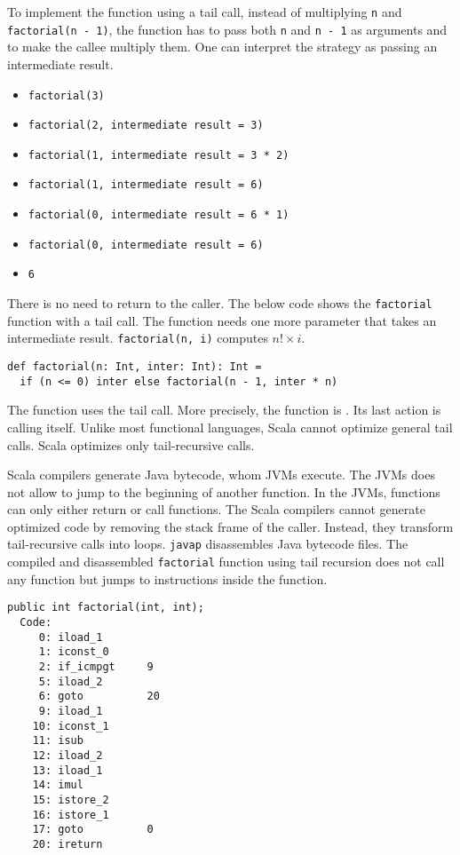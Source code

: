 To implement the function using a tail call, instead of multiplying \verb!n! and
\verb!factorial(n - 1)!, the function has to pass both \verb!n! and \verb!n - 1!
as arguments and to make the callee multiply them. One can interpret the strategy
as passing an intermediate result.

\begin{itemize}
\item \verb!factorial(3)!
\item \verb!factorial(2, intermediate result = 3)!
\item \verb!factorial(1, intermediate result = 3 * 2)!
\item \verb!factorial(1, intermediate result = 6)!
\item \verb!factorial(0, intermediate result = 6 * 1)!
\item \verb!factorial(0, intermediate result = 6)!
\item \verb!6!
\end{itemize}

There is no need to return to the caller. The below code shows the
\verb!factorial! function with a tail call. The function needs one more parameter
that takes an intermediate result. \verb!factorial(n, i)! computes \(n!\times
i\).

\begin{verbatim}
def factorial(n: Int, inter: Int): Int =
  if (n <= 0) inter else factorial(n - 1, inter * n)
\end{verbatim}

The function uses the tail call. More precisely, the function is
. Its last action is calling itself. Unlike most functional
languages, Scala cannot optimize general tail calls. Scala optimizes only
tail-recursive calls.

Scala compilers generate Java bytecode, whom JVMs execute. The JVMs does not
allow to jump to the beginning of another function. In the JVMs, functions can
only either return or call functions. The Scala compilers cannot generate
optimized code by removing the stack frame of the caller. Instead, they transform
tail-recursive calls into loops. \verb!javap! disassembles Java bytecode files.
The compiled and disassembled \verb!factorial! function using tail recursion does
not call any function but jumps to instructions inside the function.

\begin{verbatim}
public int factorial(int, int);
  Code:
     0: iload_1
     1: iconst_0
     2: if_icmpgt     9
     5: iload_2
     6: goto          20
     9: iload_1
    10: iconst_1
    11: isub
    12: iload_2
    13: iload_1
    14: imul
    15: istore_2
    16: istore_1
    17: goto          0
    20: ireturn
\end{verbatim}

